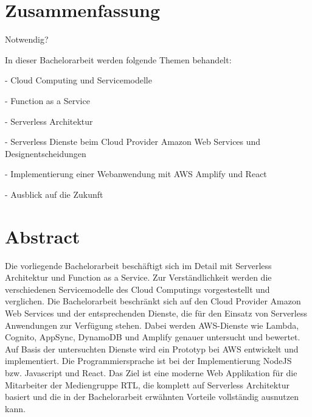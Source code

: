 
\section*{Zusammenfassung}
Notwendig?

In dieser Bachelorarbeit werden folgende Themen behandelt:

- Cloud Computing und Servicemodelle

- Function as a Service

- Serverless Architektur

- Serverless Dienste beim Cloud Provider Amazon Web Services und Designentscheidungen

- Implementierung einer Webanwendung mit AWS Amplify und React

- Ausblick auf die Zukunft



\section*{Abstract}

Die vorliegende Bachelorarbeit beschäftigt sich im Detail mit Serverless Architektur und Function as a Service.
Zur Verständlichkeit werden die verschiedenen Servicemodelle des Cloud Computings vorgestestellt und verglichen.
Die Bachelorarbeit beschränkt sich auf den Cloud Provider Amazon Web Services und der entsprechenden Dienste, die für den Einsatz von Serverless Anwendungen zur Verfügung stehen.
Dabei werden AWS-Dienste wie Lambda, Cognito, AppSync, DynamoDB und Amplify genauer untersucht und bewertet.
Auf Basis der untersuchten Dienste wird ein Prototyp bei AWS entwickelt und implementiert. Die Programmiersprache ist bei der Implementierung NodeJS bzw. Javascript und React.
Das Ziel ist eine moderne Web Applikation für die Mitarbeiter der Mediengruppe RTL, die komplett auf Serverless Architektur basiert
und die in der Bachelorarbeit erwähnten Vorteile vollständig ausnutzen kann.




\clearpage
